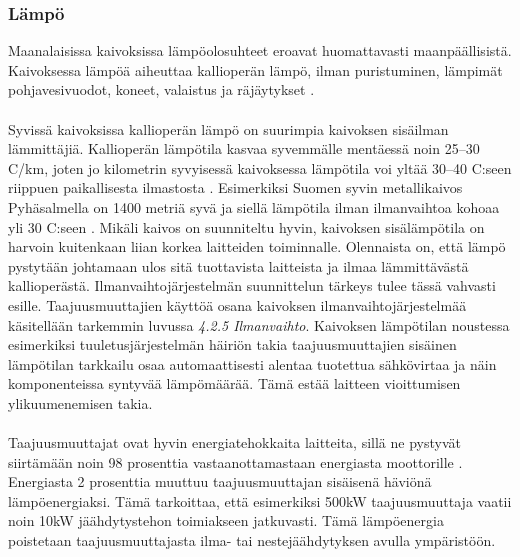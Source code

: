 \documentclass[finnish,12pt,a4paper,pdftex,elec,utf8]{aaltothesis}
\begin{document}
\subsubsection{Lämpö}
Maanalaisissa kaivoksissa lämpöolosuhteet eroavat huomattavasti maanpäällisistä. Kaivoksessa lämpöä aiheuttaa kallioperän lämpö, ilman puristuminen, lämpimät pohjavesivuodot, koneet, valaistus ja räjäytykset \cite[s. 305]{Hakapää}. 
\\\\
Syvissä kaivoksissa kallioperän lämpö on suurimpia kaivoksen sisäilman lämmittäjiä. Kallioperän lämpötila kasvaa syvemmälle mentäessä noin 25--30 \textdegree C/km, joten jo kilometrin syvyisessä kaivoksessa lämpötila voi yltää 30--40 \textdegree C:seen riippuen paikallisesta ilmastosta \cite[s. 62]{maanlampo}.
Esimerkiksi Suomen syvin metallikaivos Pyhäsalmella on 1400 metriä syvä ja siellä lämpötila ilman ilmanvaihtoa kohoaa yli 30 \textdegree C:seen \cite{Pyhäsalmi}. Mikäli kaivos on suunniteltu hyvin, kaivoksen sisälämpötila on harvoin kuitenkaan liian korkea laitteiden toiminnalle. Olennaista on, että lämpö pystytään johtamaan ulos sitä tuottavista laitteista ja ilmaa lämmittävästä kallioperästä. Ilmanvaihtojärjestelmän suunnittelun tärkeys tulee tässä vahvasti esille. Taajuusmuuttajien käyttöä osana kaivoksen ilmanvaihtojärjestelmää käsitellään tarkemmin luvussa \textit{4.2.5 Ilmanvaihto}. Kaivoksen lämpötilan noustessa esimerkiksi tuuletusjärjestelmän häiriön takia taajuusmuuttajien sisäinen lämpötilan tarkkailu osaa automaattisesti alentaa tuotettua sähkövirtaa ja näin komponenteissa syntyvää lämpömäärää. Tämä estää laitteen vioittumisen ylikuumenemisen takia.
\\\\
Taajuusmuuttajat ovat hyvin energiatehokkaita laitteita, sillä ne pystyvät siirtämään noin 98 prosenttia vastaanottamastaan energiasta moottorille \cite{ABBinmining}. Energiasta 2 prosenttia muuttuu taajuusmuuttajan sisäisenä häviönä lämpöenergiaksi. Tämä tarkoittaa, että esimerkiksi 500kW taajuusmuuttaja vaatii noin 10kW jäähdytystehon toimiakseen jatkuvasti. Tämä lämpöenergia poistetaan taajuusmuuttajasta ilma- tai nestejäähdytyksen avulla ympäristöön.
 
\end{document}
